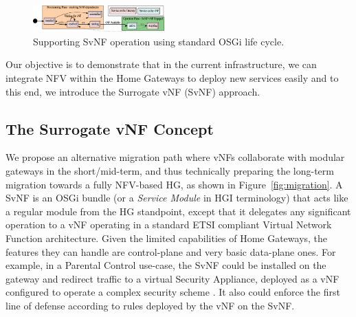 

\begin{figure}
	
	\center

	\includegraphics[width=0.45\textwidth]{fig/osgi.pdf}
	\caption{ Supporting SvNF operation using standard OSGi life cycle.
    \label{fig:osgisvnf}
    }
\end{figure}
	   


Our objective is to demonstrate that in the current infrastructure, we can integrate NFV within the Home Gateways to deploy new services easily and to this end, we introduce the Surrogate vNF (SvNF) approach.

\subsection{The Surrogate vNF Concept}

We propose an alternative migration path where vNFs collaborate with modular gateways in the short/mid-term, and thus technically preparing the long-term migration towards a fully NFV-based HG, as shown in Figure~\ref{fig:migration}.
A SvNF is an OSGi bundle (or a \textit{Service Module} in HGI terminology) that acts like a regular module from the HG standpoint, except that it delegates any significant operation to a vNF operating in a standard ETSI compliant Virtual Network Function architecture. 
Given the limited capabilities of Home Gateways, the features they can handle are control-plane and very basic data-plane ones.
For example, in a Parental Control use-case, the SvNF could be installed on the gateway and redirect traffic to a virtual Security Appliance, deployed as a vNF configured to operate a complex security scheme \cite{basile_novel_2015}. It also could enforce the first line of defense according to rules deployed by the vNF on the SvNF.

